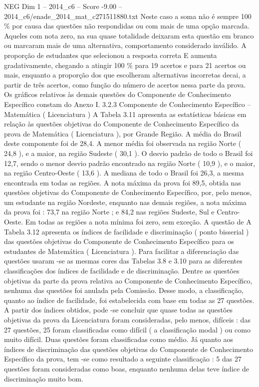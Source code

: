 \begin{textsample}{NEG Dim 1 – 2014\_c6 – Score -9.00 – 2014\_c6/enade\_2014\_mat\_c271511880.txt}
Neste caso a soma não é sempre 100 \% por causa das questões não respondidas ou com mais de uma opção marcada.
Aqueles com nota zero, na sua quase totalidade deixaram esta questão em branco ou marcaram mais de uma alternativa, comportamento considerado inválido.
A proporção de estudantes que selecionou a resposta correta E aumenta gradativamente, chegando a atingir 100 \% para 19 acertos e para 21 acertos ou mais, enquanto a proporção dos que escolheram alternativas incorretas decai, a partir de três acertos, como função do número de acertos nessa parte da prova.
Os gráficos relativos às demais questões do Componente de Conhecimento Específico constam do Anexo I. 3.2.3 Componente de Conhecimento Específico – Matemática ( Licenciatura ) A Tabela 3.11 apresenta as estatísticas básicas em relação às questões objetivas do Componente de Conhecimento Específico da prova de Matemática ( Licenciatura ), por Grande Região.
A média do Brasil deste componente foi de 28,4.
A menor média foi observada na região Norte ( 24,8 ), e a maior, na região Sudeste ( 30,1 ).
O desvio padrão de todo o Brasil foi 12,7, sendo o menor desvio padrão encontrado na região Norte ( 10,9 ), e o maior, na região Centro-Oeste ( 13,6 ).
A mediana de todo o Brasil foi 26,3, a mesma encontrada em todas as regiões.
A nota máxima da prova foi 89,5, obtida nas questões objetivas do Componente de Conhecimento Específico, por, pelo menos, um estudante na região Nordeste, enquanto nas demais regiões, a nota máxima da prova foi : 73,7 na região Norte ; e 84,2 nas regiões Sudeste, Sul e Centro-Oeste.
Em todas as regiões a nota mínima foi zero, sem exceção.
A questão de A Tabela 3.12 apresenta os índices de facilidade e discriminação ( ponto bisserial ) das questões objetivas do Componente de Conhecimento Específico para os estudantes de Matemática ( Licenciatura ).
Para facilitar a diferenciação das questões usaram -se as mesmas cores das Tabelas 3.8 e 3.10 para as diferentes classificações dos índices de facilidade e de discriminação.
Dentre as questões objetivas da parte da prova relativa ao Componente de Conhecimento Específico, nenhuma das questões foi anulada pela Comissão.
Desse modo, a classificação, quanto ao índice de facilidade, foi estabelecida com base em todas as 27 questões.
A partir dos índices obtidos, pode -se concluir que quase todas as questões objetivas da prova da Licenciatura foram consideradas, pelo menos, difíceis : das 27 questões, 25 foram classificadas como difícil ( a classificação modal ) ou como muito difícil.
Duas questões foram classificadas como médio.
Já quanto aos índices de discriminação das questões objetivas do Componente de Conhecimento Específico da prova, tem -se como resultado a seguinte classificação : 5 das 27 questões foram consideradas como boas, enquanto nenhuma delas teve índice de discriminação muito bom.

\end{textsample}
